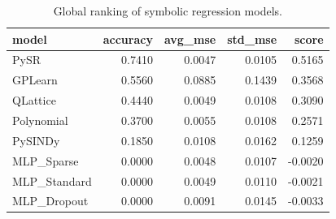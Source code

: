 \begin{table}
\caption{Global ranking of symbolic regression models.}
\label{tab:ranking_models}
\begin{tabular}{lrrrr}
\toprule
model & accuracy & avg_mse & std_mse & score \\
\midrule
PySR & 0.7410 & 0.0047 & 0.0105 & 0.5165 \\
GPLearn & 0.5560 & 0.0885 & 0.1439 & 0.3568 \\
QLattice & 0.4440 & 0.0049 & 0.0108 & 0.3090 \\
Polynomial & 0.3700 & 0.0055 & 0.0108 & 0.2571 \\
PySINDy & 0.1850 & 0.0108 & 0.0162 & 0.1259 \\
MLP_Sparse & 0.0000 & 0.0048 & 0.0107 & -0.0020 \\
MLP_Standard & 0.0000 & 0.0049 & 0.0110 & -0.0021 \\
MLP_Dropout & 0.0000 & 0.0091 & 0.0145 & -0.0033 \\
\bottomrule
\end{tabular}
\end{table}
